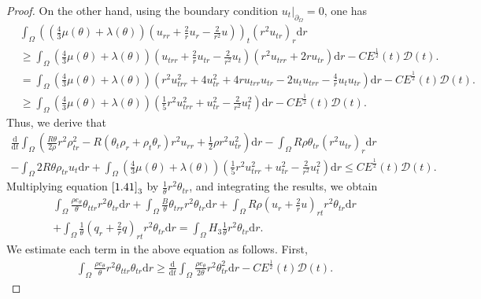 \documentclass[11pt,reqno]{amsart}
\numberwithin{equation}{section}
\newcommand{\dif}{\mathrm{d}}
\begin{document}
\begin{proof}
 On the other hand, using the boundary condition $u_t|_{\partial_\Omega}=0$, one has
 \begin{align*}
& \int_{\Omega}\left( \left(\frac{4}{3} \mu(\theta)+\lambda(\theta)\right)\left(u_{rr}+\frac{2}{r}u_r-\frac{2}{r^2} u\right)\right)_t (r^2 u_{tr})_r \dif r\\
  &\ge \int_{\Omega} \left(\frac{4}{3} \mu(\theta)+\lambda(\theta)\right)\left(u_{trr}+\frac{2}{r}u_{tr}-\frac{2}{r^2} u_t\right) (r^2 u_{trr}+2r u_{tr}) \dif r-CE^\frac{1}{2}(t) \mathcal D(t).\\
  &=\int_{\Omega} \left(\frac{4}{3} \mu(\theta)+\lambda(\theta)\right) \left( r^2 u_{trr}^2+4u_{tr}^2+4r u_{trr} u_{tr} -2 u_t u_{trr}-\frac{4}{r} u_t u_{tr}\right)\dif r-CE^\frac{1}{2}(t) \mathcal D(t).\\
  &\ge   \int_{\Omega} \left(\frac{4}{3} \mu(\theta)+\lambda(\theta)\right)\left(\frac{1}{5} r^2 u_{trr}^2+u_{tr}^2-\frac{2}{r^2} u_t^2\right) \dif r-C E^\frac{1}{2}(t) \mathcal D(t).
  \end{align*}
 Thus, we derive that
 \begin{align}\label{1.43}
 \frac{\dif }{\dif t} \int_{\Omega} \left(\frac{R\theta}{2\rho} r^2 \rho_{tr}^2-R(\theta_t \rho_r+\rho_t\theta_r)r^2u_{rr} +\frac{1}{2} \rho r^2 u_{tr}^2 \right) \dif r -\int_{\Omega} R \rho \theta_{tr} (r^2 u_{tr})_r\dif r \nonumber\\- \int_{\Omega} 2 R\theta \rho_{tr} u_t \dif r
 + \int_{\Omega} \left(\frac{4}{3} \mu(\theta)+\lambda(\theta)\right)\left(\frac{1}{5} r^2 u_{trr}^2+u_{tr}^2-\frac{2}{r^2} u_t^2\right) \dif r \le C E^\frac{1}{2}(t) \mathcal D(t).
 \end{align}
 Multiplying equation $\eqref{1.41}_3$ by $\frac{1}{\theta} r^2 \theta_{tr}$, and integrating the results, we obtain
 \begin{align}
 \int_{\Omega} \frac{\rho e_\theta}{\theta} \theta_{ttr} r^2 \theta_{tr} \dif r+\int_{\Omega} \frac{B}{\theta} \theta_{trr} r^2 \theta_{tr} \dif r+\int_{\Omega} R \rho\left( u_r+\frac{2}{r}u\right)_{rt} r^2 \theta_{tr} \dif r \nonumber \\
 +\int_{\Omega} \frac{1}{\theta} \left( q_r+\frac{2}{r} q\right)_{rt} r^2 \theta_{tr} \dif r =\int_{\Omega} H_3 \frac{1}{\theta} r^2 \theta_{tr} \dif r. \label{1.44}
 \end{align}
 We estimate each term in the above equation as follows.
 First,
 \begin{align*}
 \int_{\Omega} \frac{\rho e_\theta}{\theta} r^2 \theta_{ttr} \theta_{tr} \dif r  \ge \frac{\dif}{\dif t} \int_{\Omega} \frac{\rho e_\theta}{2\theta} r^2 \theta_{tr}^2 \dif r -C E^\frac{1}{2}(t) \mathcal D(t).

\end{align*}
\end{proof}
\end{document}

